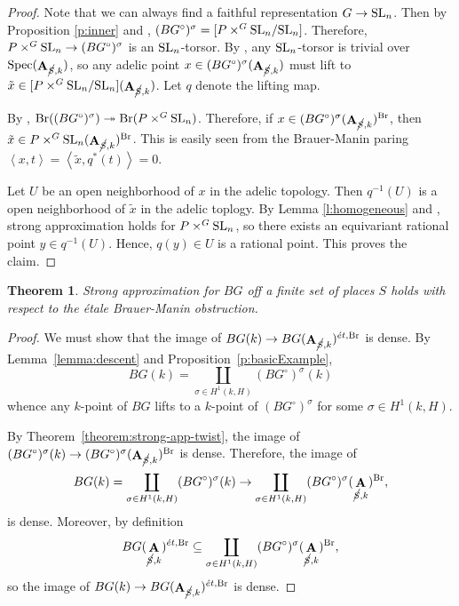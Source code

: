\documentclass[12pt, final]{amsart}
\theoremstyle{remark}
\theoremstyle{definition}
\theoremstyle{plain}
\newtheorem{theorem}[example]{Theorem}
\newcommand{\spec}{{\rm Spec}}
\renewcommand{\sl}{{\rm SL}}
\newcommand{\et}{{\acute{e}t}}
\DeclareMathOperator{\bA}{{\bf A}}
\newcommand{\cS}{\cancel{S}}
\DeclareMathOperator{\Br}{Br}
\begin{document}
\begin{proof} Note that we can always find a faithful representation $G \to \sl_n$.  Then by Proposition \ref{p:inner} and \cite[Lemma 2.1]{Dhillon:25}, 
    $(BG^\circ)^\sigma = [P \times^G \sl_n/\sl_n]$. Therefore, $P \times^G\sl_n \to (BG^\circ)^\sigma$ is an $\sl_n$-torsor.
    By \cite[Corollary 2.3]{Dhillon:25}, any $\sl_n$-torsor is trivial over $\spec(\bA_{\cS,k})$, so any adelic point $x \in (BG^\circ)^\sigma(\bA_{\cS,k})$ must lift to $\tilde{x} \in [P \times^G\sl_{n}/\sl_n](\bA_{\cS,k})$. Let $q$ denote the lifting map. 

    By \cite[Proposition 5.3]{Dhillon:25}, $\Br((BG^\circ)^{\sigma}) \twoheadrightarrow \Br(P\times^G \sl_n)$. Therefore, if $x \in (BG^\circ)^{\sigma}(\bA_{\cS,k})^{\Br}$, then $\tilde{x} \in  P\times^G\sl_n(\bA_{\cS,k})^{\Br}$. This is easily seen from the Brauer-Manin paring $\left<x, t\right> = \left<\tilde{x}, q^{\ast}(t)\right> = 0$.

    Let $U$ be an open neighborhood of $x$ in the adelic topology. Then $q^{-1}(U)$ is a open neighborhood of $\tilde{x}$ in the adelic toplogy. By Lemma \ref{l:homogeneous} and \cite[Theorem 0.1]{borovoi-demarche:13}, strong approximation holds for $P\times^G\sl_n$, so there exists an equivariant rational point $y \in q^{-1}(U)$. Hence, $q(y) \in U$ is a rational point. This proves the claim.
\end{proof}


\begin{theorem}
    Strong approximation for $BG$ off a finite set of places $S$ holds with respect to the \'etale Brauer-Manin obstruction.
\end{theorem}

\begin{proof}
    We must show that the image of $BG(k) \to BG(\bA_{\cS, k})^{\et,\Br}$ is dense.
    By Lemma~\ref{lemma:descent} and Proposition~\ref{p:basicExample}, 
    \[
        BG(k) = \coprod_{\sigma \in H^1(k,H)} (BG^{\circ})^\sigma(k)
    \] whence any $k$-point of $BG$ lifts to a $k$-point of $(BG^{\circ})^\sigma$ for some $\sigma \in H^1(k, H)$. 

    By Theorem~\ref{theorem:strong-app-twist}, the image of $(BG^{\circ})^\sigma(k) \to (BG^{\circ})^{\sigma}(\bA_{\cS,k})^{\Br}$ is dense. Therefore, the image of 
    \[
        BG(k) = \coprod_{\sigma \in H^1(k,H)} (BG^{\circ})^\sigma(k) \to \coprod_{\sigma\in H^1(k,H)} (BG^{\circ})^{\sigma}(\bA_{\cS,k})^{\Br},
    \] is dense. Moreover, by definition
    \[
        BG(\bA_{\cS, k})^{\et,\Br} \subseteq \coprod_{\sigma\in H^1(k,H)} (BG^{\circ})^{\sigma}(\bA_{\cS,k})^{\Br},
    \] so the image of $BG(k) \to BG(\bA_{\cS, k})^{\et,\Br}$ is dense.
\end{proof}
\end{document}
